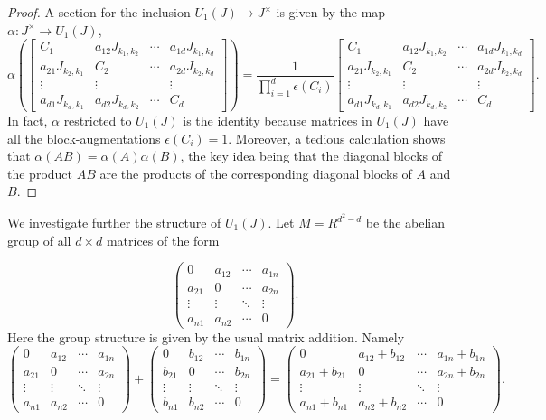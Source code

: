 \documentclass[12pt, a4paper]{amsart}
\numberwithin{equation}{section} %
\theoremstyle{plain}
\theoremstyle{definition}
\theoremstyle{plain}
\theoremstyle{remark}
\begin{document}
\begin{proof}
A section for the inclusion $U_1(J)\to J^\times$ is given by the map $\alpha:J^\times\to U_1(J)$,
\[
\alpha\left(\begin{bmatrix} 
C_1&a_{12} J_{k_1,k_2} &\cdots & a_{1d}J_{k_1,k_d}\\
a_{21}J_{k_2,k_1} &C_2 &\cdots & a_{2d}J_{k_2,k_d}\\
\vdots&\vdots& &\vdots\\
a_{d1}J_{k_d,k_1}&a_{d2}J_{k_d,k_2}&\cdots& C_d
\end{bmatrix} \right) = \frac{1}{\prod_{i=1}^d\epsilon(C_i)}\begin{bmatrix} 
C_1&a_{12} J_{k_1,k_2} &\cdots & a_{1d}J_{k_1,k_d}\\
a_{21}J_{k_2,k_1} &C_2 &\cdots & a_{2d}J_{k_2,k_d}\\
\vdots&\vdots& &\vdots\\
a_{d1}J_{k_d,k_1}&a_{d2}J_{k_d,k_2}&\cdots& C_d
\end{bmatrix}.
\]
In fact, $\alpha$ restricted to $U_1(J)$ is the identity because matrices in $U_1(J)$ have all the block-augmentations $\epsilon(C_i)=1$.
Moreover, a tedious calculation shows that $\alpha(AB)=\alpha(A)\alpha(B)$, the key idea being that the diagonal blocks of the product $AB$ are the products of the corresponding diagonal blocks of $A$ and $B$.
\end{proof}
We investigate further the structure of $U_1(J).$ Let $M=R^{d^2-d}$ be the abelian group of all $d \times d$ matrices  of the form 

\[ \begin{pmatrix}
0 & a_{12} & \cdots & a_{1n} \\
a_{21} & 0 & \cdots & a_{2n} \\
\vdots  & \vdots  & \ddots & \vdots  \\
a_{n1} & a_{n2} & \cdots & 0 \end{pmatrix} .\] 
Here the group structure is given by the usual matrix addition. Namely 
\[ \begin{pmatrix}
0 & a_{12} & \cdots & a_{1n} \\
a_{21} & 0 & \cdots & a_{2n} \\
\vdots  & \vdots  & \ddots & \vdots  \\
a_{n1} & a_{n2} & \cdots & 0 \end{pmatrix} + 
\begin{pmatrix}
0 & b_{12} & \cdots & b_{1n} \\
b_{21} & 0 & \cdots & b_{2n} \\
\vdots  & \vdots  & \ddots & \vdots  \\
b_{n1} & b_{n2} & \cdots & 0 \end{pmatrix}= \begin{pmatrix}
0 & a_{12}+b_{12} & \cdots & a_{1n}+b_{1n} \\
a_{21}+b_{21} & 0 & \cdots & a_{2n}+b_{2n} \\
\vdots  & \vdots  & \ddots & \vdots  \\
a_{n1}+b_{n1} & a_{n2}+b_{n2} & \cdots & 0 \end{pmatrix} .\] 
\end{document}
